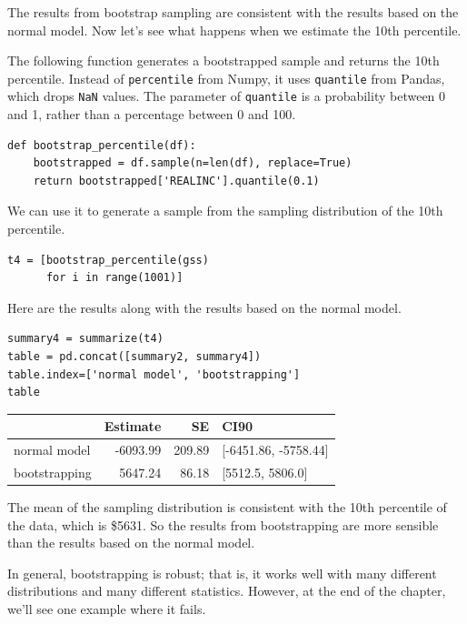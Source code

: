 The results from bootstrap sampling are consistent with the results
based on the normal model. Now let's see what happens when we estimate
the 10th percentile.

The following function generates a bootstrapped sample and returns the
10th percentile. Instead of \passthrough{\lstinline!percentile!} from
Numpy, it uses \passthrough{\lstinline!quantile!} from Pandas, which
drops \passthrough{\lstinline!NaN!} values. The parameter of
\passthrough{\lstinline!quantile!} is a probability between 0 and 1,
rather than a percentage between 0 and 100.

\begin{lstlisting}[]
def bootstrap_percentile(df):
    bootstrapped = df.sample(n=len(df), replace=True)
    return bootstrapped['REALINC'].quantile(0.1)
\end{lstlisting}

We can use it to generate a sample from the sampling distribution of the
10th percentile.

\begin{lstlisting}[]
t4 = [bootstrap_percentile(gss)
      for i in range(1001)]
\end{lstlisting}

Here are the results along with the results based on the normal model.

\begin{lstlisting}[]
summary4 = summarize(t4)
table = pd.concat([summary2, summary4])
table.index=['normal model', 'bootstrapping']
table
\end{lstlisting}

\begin{tabular}{lrrl}
\midrule
{} &  Estimate &      SE &                  CI90 \\
\midrule
normal model  &  -6093.99 &  209.89 &  [-6451.86, -5758.44] \\
bootstrapping &   5647.24 &   86.18 &      [5512.5, 5806.0] \\
\midrule
\end{tabular}

The mean of the sampling distribution is consistent with the 10th
percentile of the data, which is \$5631. So the results from
bootstrapping are more sensible than the results based on the normal
model.

In general, bootstrapping is robust; that is, it works well with many
different distributions and many different statistics. However, at the
end of the chapter, we'll see one example where it fails.


